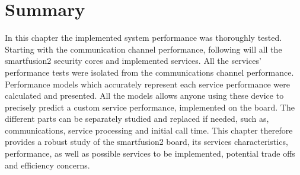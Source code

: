 

\section*{Summary}\label{chap:evaluation:summary}

In this chapter the implemented system performance was thoroughly tested. Starting with the communication channel performance, following will all the smartfusion2 security cores and implemented services. All the services' performance tests were isolated from the communications channel performance. Performance models which accurately represent each service performance were calculated and presented. All the models allows anyone using these device to precisely predict a custom service performance, implemented on the board. The different parts can be separately studied and replaced if needed, such as, communications, service processing and initial call time. This chapter therefore provides a robust study of the smartfusion2 board, its services characteristics, performance, as well as possible services to be implemented, potential trade offs and efficiency concerns.
